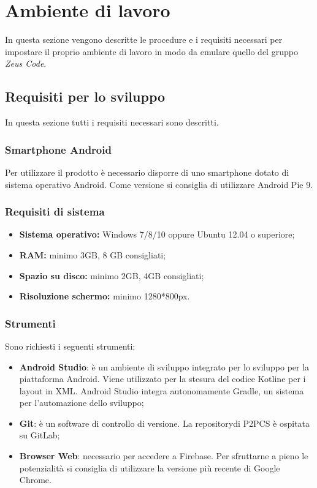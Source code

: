 \section{Ambiente di lavoro}
In questa sezione vengono descritte le procedure e i requisiti necessari per impostare il proprio ambiente di lavoro in modo da emulare quello del gruppo \textit{Zeus Code}.  
\subsection{Requisiti per lo sviluppo}
In questa sezione tutti i requisiti necessari sono descritti.
\subsubsection{Smartphone Android}
Per utilizzare il prodotto è necessario disporre di uno smartphone dotato di sistema operativo Android\glo. Come versione si consiglia di utilizzare Android Pie 9.
\subsubsection{Requisiti di sistema}
\begin{itemize}
	\item \textbf{Sistema operativo:} Windows 7/8/10 oppure Ubuntu 12.04 o superiore;
	\item \textbf{RAM:} minimo 3GB, 8 GB consigliati;
	\item \textbf{Spazio su disco:} minimo 2GB, 4GB consigliati;
	\item \textbf{Risoluzione schermo:} minimo 1280*800px.
\end{itemize}
\subsubsection{Strumenti}
Sono richiesti i seguenti strumenti:
\begin{itemize}
	\item \textbf{Android Studio}: è un ambiente di sviluppo integrato per lo sviluppo per la piattaforma Android\glo. Viene utilizzato per la stesura del codice Kotlin\glosp e per i layout in XML\glo. Android Studio integra autonomamente Gradle, un sistema per l'automazione dello sviluppo;
	\item \textbf{Git}: è un software di controllo di versione. La repository\glosp di P2PCS è ospitata su GitLab\glo;
	\item \textbf{Browser Web}: necessario per accedere a Firebase\glo. Per sfruttarne a pieno le potenzialità si consiglia di utilizzare la versione più recente di Google Chrome.
\end{itemize}
